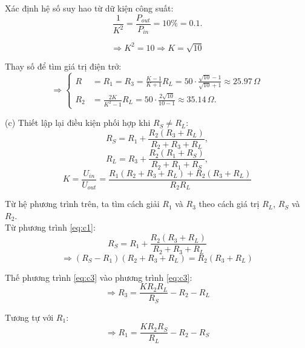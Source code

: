 Xác định hệ số suy hao từ dữ kiện công suất:
\begin{equation}
   \frac{1}{K^2}= \frac{P_{out}}{P_{in}} = 10\% = 0.1.
\end{equation}

\begin{equation*}
    \Rightarrow K^2 = 10 \Rightarrow K = \sqrt{10}
\end{equation*}

Thay số để tìm giá trị điện trở:
\begin{equation*}
    \Rightarrow \left\{
\begin{aligned}
    R &= R_1 = R_3 = \frac{K - 1}{K + 1} R_L = 50 \cdot \frac{\sqrt{10} -1}{\sqrt{10} +1} \approx 25.97\,\Omega  \\ 
    R_2 &= \frac{2K}{K^2 - 1} R_L = 50 \cdot \frac{2\sqrt{10} }{10 -1} \approx 35.14\,\Omega.
\end{aligned}
\right.
\end{equation*}
 

(c) Thiết lập lại điều kiện phối hợp khi $R_S \neq R_L$:
\begin{equation}
\label{eq:c1}
R  _S = R_1 + \frac{R_2(R_3 + R_L)}{R_2 + R_3 + R_L},
\end{equation}
\begin{equation}
R  _L = R_3 + \frac{R_2(R_1 + R_S)}{R_2 + R_1 + R_S},
\end{equation}
\begin{equation}
\label{eq:c2}
K   = \frac{U_{in}}{U_{out}}
 = \frac{R_1(R_2 + R_3 + R_L) + R_2(R_3 + R_L)}{R_2 R_L}
\end{equation}

Từ hệ phương trình trên, ta tìm cách giải $R_1$ và $R_3$ theo cách giá trị $R_L$, $R_S$ và $R_2$.\\
Từ phương trình \eqref{eq:c1}:
\begin{equation}
R  _S = R_1 + \frac{R_2(R_3 + R_L)}{R_2 + R_3 + R_L} 
\end{equation}
\begin{equation}
\label{eq:c3}
    \Rightarrow (R_S - R_1)(R_2 + R_3 + R_L) = R_2(R_3 + R_L) 
\end{equation}

Thế phương trình \eqref{eq:c3} vào phương trình \eqref{eq:c3}:
\begin{equation}
    \Rightarrow R_3 = \frac{KR_2R_L}{R_S}-R_2-R_L
\end{equation}

Tương tự với $R_1$:
\begin{equation}
    \Rightarrow R_1 = \frac{KR_2R_S}{R_L}-R_2-R_S
\end{equation}
    
